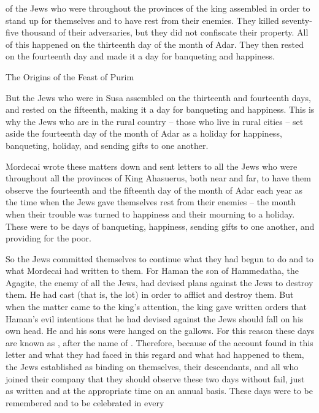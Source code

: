 {of the Jews
who were throughout the provinces
of the king
assembled
in order to stand up
for themselves
and to have rest
from their enemies.
They killed
seventy-five
thousand
of their adversaries,
but they did not
confiscate
their property.
All of this
happened on the thirteenth
day
of the month
of Adar.
They then rested
on the fourteenth
day and made
it a day
for banqueting
and happiness.
\par }{\SH The Origins of the Feast of Purim
\par }{\PP {}But the Jews
who were in Susa
assembled
on the thirteenth
and fourteenth
days, and rested
on the fifteenth,
making it
a day
for banqueting
and happiness.
This is why
the Jews
who are in the rural country – those who live in rural cities – set aside the fourteenth day of the month of Adar as a holiday for happiness, banqueting, holiday, and sending gifts to one another.
\par }{\PP {}Mordecai
wrote
these
matters
down and sent
letters
to
all
the Jews
who were throughout all
the provinces
of King
Ahasuerus,
both near
and far,
to have
them
observe
the fourteenth
and the fifteenth
day
of the month
of Adar
each year
as the time
when
the Jews
gave themselves rest
from their enemies
– the month
when
their
trouble
was turned
to happiness
and their mourning
to a holiday.
These were to be
days
of banqueting,
happiness,
sending
gifts
to one
another,
and providing
for the poor.
\par }{\PP {}So the Jews
committed themselves to continue what they had
begun
to do
and to what
Mordecai
had
written
to them.
For
Haman
the son
of Hammedatha,
the Agagite,
the enemy
of all
the Jews,
had devised
plans against
the Jews
to destroy
them. He had cast
{}
(that
is, the lot) in order to afflict
and destroy them.
But when the matter came
to the king’s attention, the king
gave
written orders
that Haman’s
evil
intentions
that he had
devised
against
the
Jews
should fall on
his own head.
He and his sons
were hanged
on
the gallows.
For
this reason
these
days
are known
as
{}, after
the name
of
{}.
Therefore, because of the account found in this letter and what they had faced in this regard and what had happened to them, the Jews
established
as binding
on themselves, their descendants,
and all
who joined their company
that they should observe
these
two
days
without
fail,
just as written
and at the appropriate time
on an annual basis.
These
days
were to be remembered
and to be celebrated
in every
}
